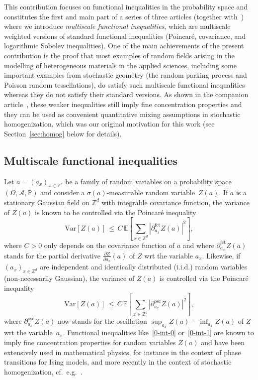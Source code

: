 \documentclass[11pt]{article}
\theoremstyle{definition}
\numberwithin{equation}{section}
\numberwithin{figure}{section}
\numberwithin{table}{section}
\newcommand{\Z}{\mathbb Z}
\newcommand{\p}{\mathbb{P}}
\newcommand{\E}{\mathbb{E}}
\newcommand{\A}{\mathcal A}
\newcommand{\parfct}[1]{\partial_{#1}^{\operatorname{fct}}}
\newcommand{\osc}{\partial^{\mathrm{osc}}}
\newcommand{\var}[1]{\mathrm{Var}\left[#1\right]}
\begin{document}
This contribution focuses on functional inequalities in the probability space and constitutes the first and main part of a series of three articles (together with~\cite{DG1,DG3}) where we introduce \emph{multiscale functional inequalities}, which are multiscale weighted versions of standard functional inequalities (Poincaré, covariance, and logarithmic Sobolev inequalities). One of the main achievements of the present contribution is the proof that most examples of random fields arising in the modelling of heterogeneous materials in the applied sciences, including some important examples from stochastic geometry (the random parking process and Poisson random tessellations), do satisfy such multiscale functional inequalities whereas they do not satisfy their standard versions. As shown in the companion article~\cite{DG1}, these weaker inequalities still imply fine concentration properties and they can be used as convenient quantitative mixing assumptions in stochastic homogenization, which was our original motivation for this work (see Section~\ref{sec:homog} below for details).



\subsection{Multiscale functional inequalities}

Let $a=(a_x)_{x\in \Z^d}$ be a family of random variables on a probability space $(\Omega,\A,\p)$ and consider a $\sigma(a)$-measurable random variable~$Z(a)$. If $a$ is a stationary Gaussian field on $\Z^d$ with integrable covariance function, the variance of $Z(a)$ is known to be controlled via the Poincaré inequality
\begin{equation}\label{0-int-0}
\var{Z(a)} \,\le \,C\,\E\left[{\sum_{x\in \Z^d} |\parfct{a_x} Z(a)|^2}\right],
\end{equation}
where $C>0$ only depends on the covariance function of $a$ and where $\parfct{a_x} Z(a)$ stands for the partial derivative $\frac{\partial Z}{\partial a_x}(a)$ of $Z$ wrt the variable $a_x$. Likewise, if $(a_x)_{x\in \Z^d}$ are independent and identically distributed (i.i.d.) random variables (non-necessarily Gaussian), the variance of $Z(a)$ is controlled via the Poincaré inequality
\begin{equation}\label{0-int-1}
\var{Z(a)} \,\le \,C\,\E\left[{ \sum_{x\in \Z^d} |\osc_{a_x} Z(a)|^2}\right],
\end{equation}
where $\osc_{a_x} Z(a)$ now stands for the oscillation $\sup_{a_x} Z(a)-\inf_{a_x} Z(a)$ of $Z$ wrt the variable~$a_x$. Functional inequalities like~\eqref{0-int-0} or~\eqref{0-int-1} are known to imply fine concentration properties for random variables $Z(a)$ and have been extensively used in mathematical physics, for instance in the context of phase transitions for Ising models, and more recently in the context of stochastic homogenization, cf.~e.g.~\cite{DGO1,Glotto-Neukamm-14,GNO-I,Glotto-11,Glotto-12,Marahrens-Otto-15,Naddaf-Spencer-98}.
\end{document}

